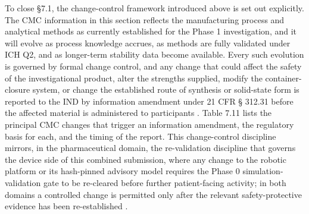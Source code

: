 To close \S 7.1, the change-control framework introduced above is set out
explicitly. The CMC information in this section reflects the manufacturing process
and analytical methods as currently established for the Phase 1 investigation, and
it will evolve as process knowledge accrues, as methods are fully validated under
ICH Q2, and as longer-term stability data become available. Every such evolution
is governed by formal change control, and any change that could affect the safety
of the investigational product, alter the strengths supplied, modify the
container-closure system, or change the established route of synthesis or
solid-state form is reported to the IND by information amendment under 21 CFR \S
312.31 before the affected material is administered to participants
\cite{phase1guidance}. Table 7.11 lists the principal CMC changes that trigger an
information amendment, the regulatory basis for each, and the timing of the
report. This change-control discipline mirrors, in the pharmaceutical domain, the
re-validation discipline that governs the device side of this combined submission,
where any change to the robotic platform or its hash-pinned advisory model
requires the Phase 0 simulation-validation gate to be re-cleared before further
patient-facing activity; in both domains a controlled change is permitted only
after the relevant safety-protective evidence has been re-established
\cite{onpremwhippl}.

\clearpage

